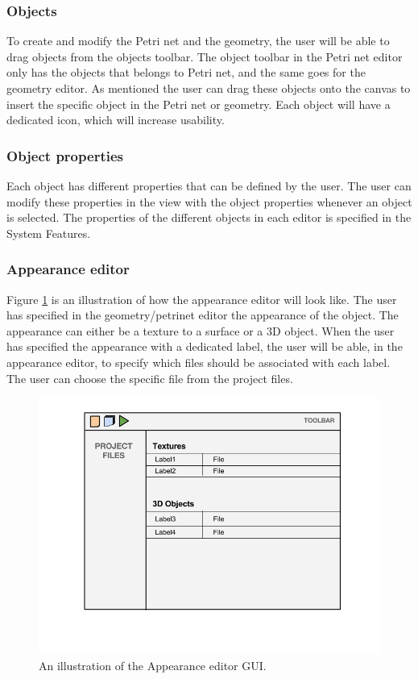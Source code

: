 \subsubsection{Objects}
To create and modify the Petri net and the geometry, the user will be able to drag objects from the objects toolbar. The object toolbar in the Petri net editor only has the objects that belongs to Petri net, and the same goes for the geometry editor. As mentioned the user can drag these objects onto the canvas to insert the specific object in the Petri net or geometry. Each object will have a dedicated icon, which will increase usability.

\subsubsection{Object properties}
Each object has different properties that can be defined by the user. The user can modify these properties in the view with the object properties whenever an object is selected. The properties of the different objects in each editor is specified in the System Features. 

\subsubsection{Appearance editor}
Figure \ref{fig:appearance_editor} is an illustration of how the appearance editor will look like. The user has specified in the geometry/petrinet editor the appearance of the object. The appearance can either be a texture to a surface or a 3D object. When the user has specified the appearance with a dedicated label, the user will be able, in the appearance editor, to specify which files should be associated with each label. The user can choose the specific file from the project files.

\begin{figure}[ht]
\begin{center}
\includegraphics[scale=0.5]{image/appearance.png}
\caption{An illustration of the Appearance editor GUI.}
\label{fig:appearance_editor}
\end{center}
\end{figure}

